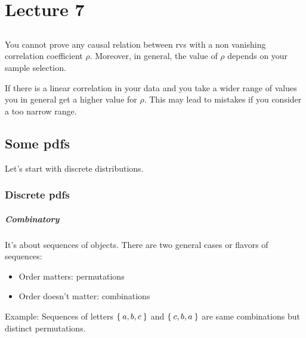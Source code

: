 
\chapter{Lecture 7}
\section{}

You cannot prove any causal relation between \acp{rv} with a non vanishing correlation coefficient $\rho$.
Moreover, in general, the value of $\rho$ depends on your sample selection.

If there is a linear correlation in your data and you take a wider range of values you in general get a higher value for $\rho$.
This may lead to mistakes if you consider a too narrow range.

\section{Some \acsp{pdf}}

Let's start with discrete distributions.

\subsection{Discrete \acsp{pdf}}

\paragraph{Combinatory}
It's about sequences of objects.
There are two general cases or flavors of sequences:
\begin{itemize}
	\item
		Order matters: permutations
	\item
		Order doesn't matter: combinations
\end{itemize}

Example: Sequences of letters $\Set{a,b,c}$ and $\Set{c,b,a}$ are same combinations but distinct permutations.

